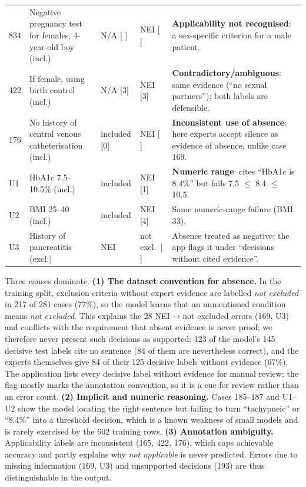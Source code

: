 \documentclass[conference]{IEEEtran}
\begin{document}
\begin{table}[t]
\begin{tabular}{p{0.6cm}p{4.6cm}p{1.9cm}p{1.9cm}p{6.6cm}}
834 & Negative pregnancy test for females, 4-year-old boy (incl.) & N/A [ ] & NEI [ ] & \textbf{Applicability not recognised}: a sex-specific criterion for a male patient. \\
422 & If female, using birth control (incl.) & N/A [3] & NEI [3] & \textbf{Contradictory/ambiguous}: same evidence (``no sexual partners''); both labels are defensible. \\
176 & No history of central venous catheterisation (incl.) & included [0] & NEI [ ] & \textbf{Inconsistent use of absence}: here experts accept silence as evidence of absence, unlike case 169. \\
U1 & HbA1c 7.5--10.5\% (incl.) & included & NEI [1] & \textbf{Numeric range}: cites ``HbA1c is 8.4\%'' but fails 7.5 $\le$ 8.4 $\le$ 10.5. \\
U2 & BMI 25--40 (incl.) & included & NEI [4] & Same numeric-range failure (BMI 33). \\
U3 & History of pancreatitis (excl.) & NEI & not excl.\ [ ] & Absence treated as negative; the app flags it under ``decisions without cited evidence''. \\
\bottomrule
\end{tabular}
\end{table}

Three causes dominate. \textbf{(1) The dataset convention for absence.} In the training split, exclusion criteria without expert evidence are labelled \emph{not excluded} in 217 of 281 cases (77\%), so the model learns that an unmentioned condition means \emph{not excluded}. This explains the 28 NEI$\rightarrow$not excluded errors (169, U3) and conflicts with the requirement that absent evidence is never proof; we therefore never present such decisions as supported: 123 of the model's 145 decisive test labels cite no sentence (84 of them are nevertheless correct), and the experts themselves give 84 of their 125 decisive labels without evidence (67\%). The application lists every decisive label without evidence for manual review; the flag mostly marks the annotation convention, so it is a cue for review rather than an error count. \textbf{(2) Implicit and numeric reasoning.} Cases 185--187 and U1--U2 show the model locating the right sentence but failing to turn ``tachypneic'' or ``8.4\%'' into a threshold decision, which is a known weakness of small models and is rarely exercised by the 602 training rows. \textbf{(3) Annotation ambiguity.} Applicability labels are inconsistent (165, 422, 176), which caps achievable accuracy and partly explains why \emph{not applicable} is never predicted. Errors due to missing information (169, U3) and unsupported decisions (193) are thus distinguishable in the output.
\end{document}
